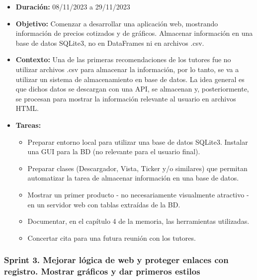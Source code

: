 \begin{itemize}
\item  
\textbf{Duración:} 08/11/2023 a 29/11/2023

\item
\textbf{Objetivo:} Comenzar a desarrollar una aplicación web, mostrando información de precios cotizados y de gráficos. Almacenar información en una base de datos SQLite3, no en DataFrames ni en archivos .csv. 

\item
\textbf{Contexto:} Una de las primeras recomendaciones de los tutores fue no utilizar archivos .csv para almacenar la información, por lo tanto, se va a utilizar un sistema de almacenamiento en base de datos. La idea general es que dichos datos se descargan con una API, se almacenan y, posteriormente, se procesan para mostrar la información relevante al usuario en archivos HTML. 

\item
\textbf{Tareas:}
	\begin{itemize}
	\tightlist
	\item 
	Preparar entorno local para utilizar una base de datos SQLite3. Instalar una GUI para la BD (no relevante para el usuario final). 
	\item 	
	Preparar clases (Descargador, Vista, Ticker y/o similares) que permitan automatizar la tarea de almacenar información en una base de datos. 
	\item 
	Mostrar un primer producto - no necesariamente visualmente atractivo - en un servidor web con tablas extraídas de la BD. 
  	\item 
  	Documentar, en el capítulo 4 de la memoria, las herramientas utilizadas. 
  	\item 
  	Concertar cita para una futura reunión con los tutores. 
  	\end{itemize}
\end{itemize}


\subsubsection{Sprint 3. Mejorar lógica de web y proteger enlaces con registro. Mostrar gráficos y dar primeros estilos}


